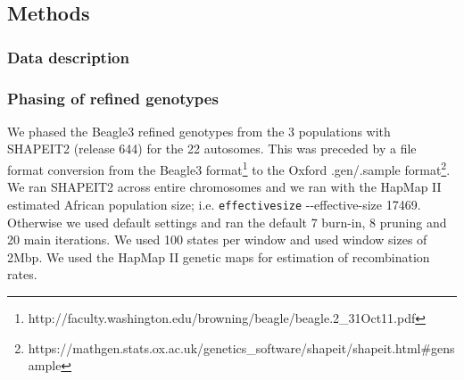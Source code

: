 \subsection{Methods}

\subsubsection{Data description}

\subsubsection{Phasing of refined genotypes}
We phased the Beagle3 refined genotypes from the 3 populations with SHAPEIT2\cite{Delaneau2012} (release 644) for the 22 autosomes. This was preceded by a file format conversion from the Beagle3 format\footnote{http://faculty.washington.edu/browning/beagle/beagle.2\_31Oct11.pdf} to the Oxford .gen/.sample format\footnote{https://mathgen.stats.ox.ac.uk/genetics\_software/shapeit/shapeit.html\#gensample}. We ran SHAPEIT2 across entire chromosomes and we ran with the HapMap II\cite{hapmap2007} estimated African population size\cite{Wright01031931}\cite{Wright1938}; i.e. \texttt{\-\-effective\-size} -{}-effective-size 17469. Otherwise we used default settings and ran the default 7 burn-in, 8 pruning and 20 main iterations. We used 100 states per window and used window sizes of 2\gls{Mbp}. We used the HapMap II genetic maps for estimation of recombination rates.

